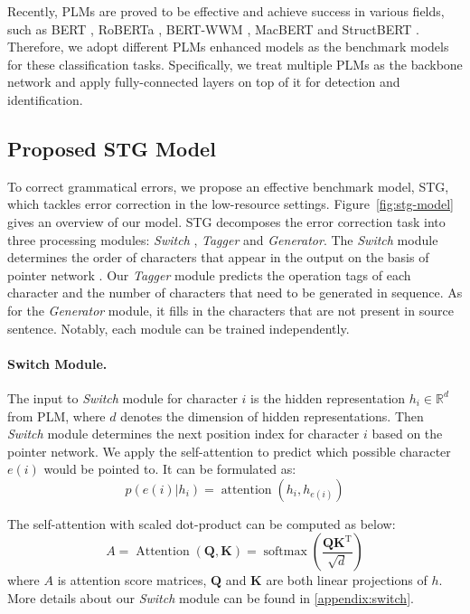\documentclass[11pt]{article}
\begin{document}
Recently, PLMs are proved to be effective and achieve success in various fields, such as BERT \cite{devlin2018bert}, RoBERTa \cite{liu2019roberta}, BERT-WWM \cite{cui2021pre}, MacBERT \cite{cui2020revisiting} and StructBERT \cite{wang2019structbert}. Therefore, we adopt different PLMs enhanced models as the benchmark models for these classification tasks. Specifically, we treat multiple PLMs as the backbone network and apply fully-connected layers on top of it for detection and identification.

\subsection{Proposed STG Model}
\label{sec:stg-model}

To correct grammatical errors, we propose an effective benchmark model, STG, which tackles error correction in the low-resource settings. Figure~\ref{fig:stg-model} gives an overview of our model. STG decomposes the error correction task into three processing modules: \emph{Switch} , \emph{Tagger} and \emph{Generator}. The \emph{Switch} module determines the order of characters that appear in the output on the basis of pointer network \cite{vinyals2015pointer}. Our \emph{Tagger} module predicts the operation tags of each character and the number of characters that need to be generated in sequence. As for the \emph{Generator} module, it fills in the characters that are not present in source sentence. Notably, each module can be trained independently.

\paragraph{Switch Module.} The input to \emph{Switch} module for character $i$ is the hidden representation $h_i \in \mathbb{R}^{d}$ from PLM, where $d$ denotes the dimension of hidden representations. Then \emph{Switch} module determines the next position index for character $i$ based on the pointer network. We apply the self-attention to predict which possible character $e(i)$ would be pointed to. It can be formulated as:
\begin{equation}
    p\left(e(i)|h_i\right) = \operatorname{attention}\left(h_i, h_{e(i)} \right)
    \label{eq:1}
\end{equation}

The self-attention with scaled dot-product can be computed as below:
\begin{equation}
    A = \operatorname{Attention}\left(\bm{Q}, \bm{K}\right)= \operatorname{softmax}\left(\frac{\bm{Q}\bm{K}^{\mathrm{T}}}{\sqrt{d}}\right)
    \label{eq:2}
\end{equation}
where $A$ is attention score matrices, $\bm{Q}$ and $\bm{K}$ are both linear projections of $h$. More details about our \emph{Switch} module can be found in \ref{appendix:switch}. 
\end{document}
